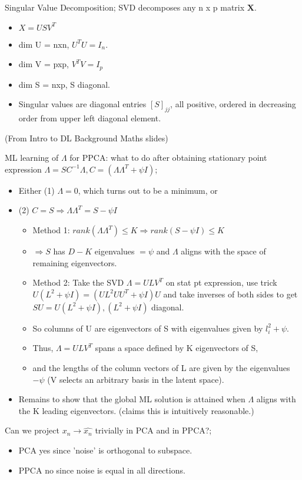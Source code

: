 \documentclass{article}
\begin{document}
Singular Value Decomposition; SVD decomposes any n x p matrix $\mathbf{X}$.\begin{itemize}
	\item $X = USV^T$
	\item dim U = nxn, $U^TU=I_n$.
	\item dim V = pxp, $V^TV=I_p$
	\item dim S = nxp, S diagonal. 
	\item Singular values are diagonal entries $[S]_{jj}$, all positive, ordered in decreasing order from upper left diagonal element.
\end{itemize} (From Intro to DL Background Maths slides)

ML learning of $\Lambda$ for PPCA: what to do after obtaining stationary point expression $\Lambda = SC^{-1}\Lambda, C=(\Lambda\Lambda^T+\psi I)$; \begin{itemize}
	\item Either (1) $\Lambda=0$, which turns out to be a minimum, or
	\item (2) $C=S \Rightarrow \Lambda\Lambda^T=S-\psi I$
	\begin{itemize}
		\item Method 1: $rank(\Lambda\Lambda^T)\leq K\Rightarrow rank(S-\psi I) \leq K$
		\item $\Rightarrow S$ has $D-K$ eigenvalues $=\psi$ and $\Lambda$ aligns with the space of remaining eigenvectors.
		\item Method 2: Take the SVD $\Lambda = ULV^T$ on stat pt expression, use trick $U(L^2+\psi I)=(UL^2UU^T+\psi I)U$ and take inverses of both sides to get $SU=U(L^2+\psi I), (L^2+\psi I)$ diagonal.
		\item So columns of U are eigenvectors of S with eigenvalues given by $l^2_i + \psi$. 
		\item Thus, $\Lambda = ULV^T$ spans a space defined by K eigenvectors of S, 
		\item and the lengths of the column vectors of L are given by the eigenvalues $-\psi$ (V selects an arbitrary basis in the latent space).
	\end{itemize}
\item Remains to show that the global ML solution is attained when $\Lambda$ aligns with the K leading eigenvectors. (claims this is intuitively reasonable.)
\end{itemize}

Can we project $x_n \rightarrow \hat{x_n}$ trivially in PCA and in PPCA?; \begin{itemize}
	\item PCA yes since 'noise' is orthogonal to subspace.
	\item PPCA no since noise is equal in all directions.
\end{itemize}
\end{document}

